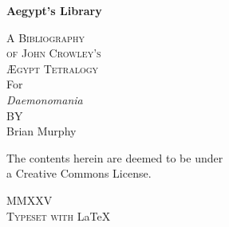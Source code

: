 

\pagestyle{empty}
\addtocounter{page}{-1}
\begin{center}
\bfseries
\nbvspace[0.5]
\Huge
\egothfamily
{\nbtitlestretch\fontsize{46pt}{48pt}\selectfont
Aegypt's Library}


\nbvspace[1]
\normalsize
\rmfamily
\textsc{A Bibliography\\
of John Crowley's\\
Ægypt Tetralogy}\\
\nbvspace[1]
\small For\\[0.5em]
\Huge \textit{Daemonomania}\\[0.5em]
\small BY\\[0.5em]
\Large Brian Murphy\\[0.5em]
\nbvspace[2]


\shadowoffset{1pt}
\shadowtext{%
{\color{Mahogany}\fontsize{60}{64}\staveLXI}}
\nbvspace[1]
\normalsize

\nbvspace[1]

\normalsize The contents herein are deemed to be under  \\
a Creative Commons License.

\nbvspace[1]




\textcopyleft \egothfamily MMXXV\\
\large
\rmfamily
\textsc{Typeset with} \LaTeX{}
\nbvspace[1]
\end{center}




